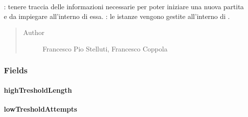 \documentclass[letterpaper,10pt,italian,openany,oneside]{sphinxmanual}
\begin{document}
\begin{fulllineitems}
\label{\detokenize{source/it/unicam/cs/pa/mastermind/gamecore/MatchStartSettings:it.unicam.cs.pa.mastermind.gamecore.MatchStartSettings}}
: tenere traccia delle informazioni necessarie per poter iniziare una nuova partita e da impiegare all’interno di essa. : le istanze vengono gestite all’interno di .
\begin{quote}\begin{description}
\item[{Author}] \leavevmode
Francesco Pio Stelluti, Francesco Coppola

\end{description}\end{quote}

\end{fulllineitems}



\subsubsection{Fields}
\label{\detokenize{source/it/unicam/cs/pa/mastermind/gamecore/MatchStartSettings:fields}}

\paragraph{highTresholdLength}
\label{\detokenize{source/it/unicam/cs/pa/mastermind/gamecore/MatchStartSettings:hightresholdlength}}

\begin{fulllineitems}
\label{\detokenize{source/it/unicam/cs/pa/mastermind/gamecore/MatchStartSettings:it.unicam.cs.pa.mastermind.gamecore.MatchStartSettings.highTresholdLength}}
\end{fulllineitems}



\paragraph{lowTresholdAttempts}
\label{\detokenize{source/it/unicam/cs/pa/mastermind/gamecore/MatchStartSettings:lowtresholdattempts}}
\end{document}
